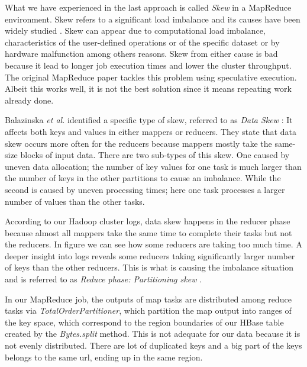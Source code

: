 What we have experienced in the last approach is called \textit{Skew} in a MapReduce environment. Skew refers to a significant load imbalance and its causes have been widely studied \cite{ananthanarayanan2010reining} \cite{dean2008mapreduce} \cite{walton1991taxonomy}. Skew can appear due to computational load imbalance, characteristics of the user-defined operations or of the specific dataset or by hardware malfunction among others reasons. Skew from either cause is bad because it lead to longer job execution times and lower the cluster throughput. The original MapReduce paper \cite{dean2008mapreduce} tackles this problem using speculative execution. Albeit this works well, it is not the best solution since it means repeating work already done.
\par
Balazinska \textit{et al.} identified a specific type of skew, referred to as \textit{Data Skew} \cite{kwon2013managing}: It affects both keys and values in either mappers or reducers. They state that data skew occurs more often for the reducers because mappers mostly take the same-size blocks of input data. There are two sub-types of this skew. One caused by uneven data allocation; the number of key values for one task is much larger than the number of keys in the other partitions to cause an imbalance. While the second is caused by uneven processing times; here one task processes a larger number of values than the other tasks. 
\par
According to our Hadoop cluster logs, data skew happens in the reducer phase because almost all mappers take the same time to complete their tasks but not the reducers. In figure  we can see how some reducers are taking too much time. A deeper insight into logs reveals some reducers taking significantly larger number of keys than the other reducers. This is what is causing the imbalance situation and is referred to as \textit{Reduce phase: Partitioning skew} \cite{kwon2012skewtune}.
\par
In our MapReduce job, the outputs of map tasks are distributed among reduce tasks via \textit{TotalOrderPartitioner}, which partition the map output into ranges of the key space, which correspond to the region boundaries of our HBase table created by the \textit{Bytes.split} method. This is not adequate for our data because it is not evenly distributed. There are lot of duplicated keys and a big part of the keys 
belongs to the same url, ending up in the same region.
\par
